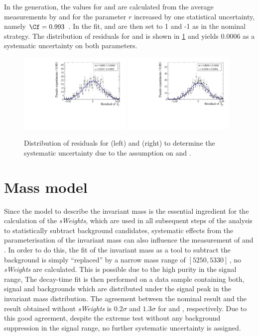 In the generation, the values for \Cf and \Cfbar are calculated from the average measurements by \belle and \babar for the parameter $r$ increased by one statistical uncertainty, namely $\Cf=0.993$~\cite{Aubert:2008zi, Das:2010be}.
In the fit, \Cf and \Cfbar are then set to \num{1} and {-1} as in the nominal strategy.
The distribution of residuals for \Sf and \Sfbar is shown in \cref{fig:systUncertC} and yields \num{0.0006} as a systematic uncertainty on both parameters.
\begin{figure}[tbp]
    \centering
    \includegraphics[width=0.48\textwidth]{10Systematics/figs/C_Sf_res.pdf}
    \includegraphics[width=0.48\textwidth]{10Systematics/figs/C_Sfbar_res.pdf}
    \caption{Distribution of residuals for \Sf (left) and \Sfbar (right) to determine the systematic uncertainty due to the assumption on \Cf and \Cfbar.}
    \label{fig:systUncertC}
\end{figure}

\section{Mass model}
\label{sec:SystUncertMass}

Since the model to describe the invariant mass is the essential ingredient for the calculation of the \emph{sWeights}, which are used in all subsequent steps of the analysis to statistically subtract background candidates, systematic effects from the parameterisation of the invariant mass can also influence the measurement of \Sf and \Sfbar.
In order to do this, the fit of the invariant mass as a tool to subtract the background is simply \enquote{replaced} by a narrow mass range of $[5250,5330]\,$\si[per-mode=symbol]{\MeVcc}, \ie no \emph{sWeights} are calculated.
This is possible due to the high purity in the signal range,
The decay-time fit is then performed on a data sample containing both, signal and backgrounds which are distributed under the signal peak in the invariant mass distribution.
The agreement between the nominal result and the result obtained without \emph{sWeights} is $0.2\sigma$ and $1.3\sigma$ for \Sf and \Sfbar, respectively.
Due to this good agreement, despite the extreme test without any background suppression in the signal range, no further systematic uncertainty is assigned.

